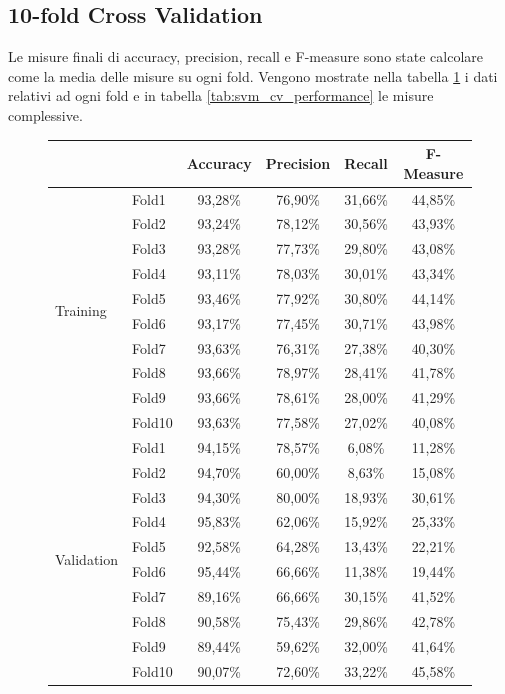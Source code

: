 \subsection{10-fold Cross Validation}
Le misure finali di accuracy, precision, recall e F-measure sono state 
calcolare come la media delle misure su ogni fold. Vengono mostrate nella 
tabella \ref{tab:svm_cv_fold_performance} i dati relativi ad ogni fold e in 
tabella \ref{tab:svm_cv_performance} le misure complessive.

\begin{figure}[H]
	\centering
	\begin{tabular}{llcccc}
		\toprule
		&& \textbf{Accuracy} & \textbf{Precision} & \textbf{Recall} & 
		\textbf{F-Measure}  \\
		\midrule
		\multirow{10}{*}{Training} & Fold1 & 93,28\% & 76,90\% & 31,66\% & 
		44,85\% \\
		& Fold2 & 93,24\%  & 78,12\% & 30,56\% & 43,93\% \\
		& Fold3 & 93,28\%  & 77,73\% & 29,80\% & 43,08\% \\
		& Fold4 & 93,11\%  & 78,03\% & 30,01\% & 43,34\% \\
		& Fold5 & 93,46\%  & 77,92\% & 30,80\% & 44,14\% \\
		& Fold6 & 93,17\%  & 77,45\% & 30,71\% & 43,98\% \\
		& Fold7 & 93,63\%  & 76,31\% & 27,38\% & 40,30\% \\
		& Fold8 & 93,66\%  & 78,97\% & 28,41\% & 41,78\% \\
		& Fold9 & 93,66\%  & 78,61\% & 28,00\% & 41,29\% \\
		& Fold10 & 93,63\% & 77,58\% & 27,02\% & 40,08\%  \\
		\midrule
		\multirow{10}{*}{Validation} & Fold1 & 94,15\% & 78,57\% & 6,08\% & 
		11,28\% \\
		& Fold2 & 94,70\% & 60,00\% & 8,63\% & 15,08\% \\
		& Fold3 & 94,30\% & 80,00\% & 18,93\% & 30,61\% \\
		& Fold4 & 95,83\% & 62,06\% & 15,92\% & 25,33\% \\
		& Fold5 & 92,58\% & 64,28\% & 13,43\% & 22,21\% \\
		& Fold6 & 95,44\% & 66,66\% & 11,38\% & 19,44\% \\
		& Fold7 & 89,16\% & 66,66\% & 30,15\% & 41,52\% \\
		& Fold8 & 90,58\% & 75,43\% & 29,86\% & 42,78\% \\
		& Fold9 & 89,44\% & 59,62\% & 32,00\% & 41,64\% \\
		& Fold10 & 90,07\% & 72,60\% & 33,22\% & 45,58\% \\
		\bottomrule 
	\end{tabular}
	\label{tab:svm_cv_fold_performance}
\end{figure}

